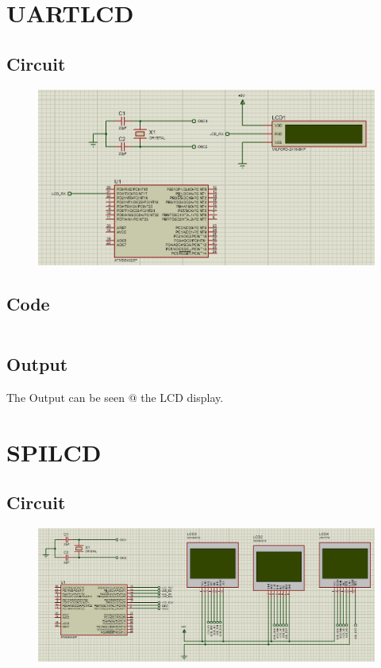 \documentclass[oneside]{book}
\begin{document}
\section{UARTLCD}
\subsection{Circuit}
\begin{figure}[H]
    \centering
    \includegraphics[height=0.2\textheight]{UARTLCD.png}
\end{figure}
\subsection{Code}
\inputminted[bgcolor=black]{c}{./programFiles/UARTLCD.c}

\subsection{Output}
\quad The Output can be seen @ the LCD display.

\section{SPILCD}
\subsection{Circuit}
\begin{figure}[H]
    \centering
    \includegraphics[height=0.2\textheight]{SPILCD.png}
\end{figure}
\end{document}
